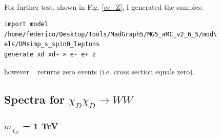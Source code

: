 \documentclass[epj,nopacs,fleqn]{svjour}
\begin{document}
\\
For further test, shown in Fig. \ref{ee_Z}, I generated the samples: 
\begin{verbatim}
import model /home/federico/Desktop/Tools/MadGraph5/MG5_aMC_v2_6_5/mod\
els/DMsimp_s_spin0_leptons
generate xd xd~ > e- e+ z
\end{verbatim}
however \MG~ returns zero events (i.e. cross section equals zero).




\clearpage
\subsection{Spectra for $\chi_D \chi_D \rightarrow WW$}
\subsubsection{$m_{\chi_D}$ = 1 TeV}
\end{document}

